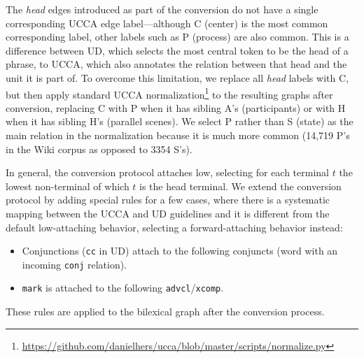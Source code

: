 \documentclass[11pt,a4paper]{article}
\begin{document}
The \textit{head} edges introduced as part of the conversion do not have a single
corresponding UCCA edge label---although C (center) is the most common corresponding label,
other labels such as P (process) are also common.
This is a difference between UD, which selects the most central token to be the head of a phrase,
to UCCA, which also annotates the relation between that head and the unit it is part of.
To overcome this limitation, we replace all \textit{head} labels with C, but then
apply standard UCCA
normalization\footnote{\url{https://github.com/danielhers/ucca/blob/master/scripts/normalize.py}}
to the resulting graphs after conversion,
replacing C with P when it has sibling A's (participants) or
with H when it has sibling H's (parallel scenes).
We select P rather than S (state) as the main relation in the normalization because
it is much more common (14,719 P's in the Wiki corpus as opposed to 3354 S's).

In general, the conversion protocol attaches low,
selecting for each terminal $t$ the lowest non-terminal of which $t$
is the head terminal.
We extend the conversion protocol by adding special rules for a few cases,
where there is a systematic mapping between the UCCA and UD guidelines
and it is different from the default low-attaching behavior,
selecting a forward-attaching behavior instead:
\begin{itemize}
  \item Conjunctions (\verb|cc| in UD) attach to the following
  conjuncts (word with an incoming \verb|conj| relation).
  \item \verb|mark| is attached to the following \verb|advcl|/\verb|xcomp|.
\end{itemize}
These rules are applied to the bilexical graph after the conversion process.
\end{document}
